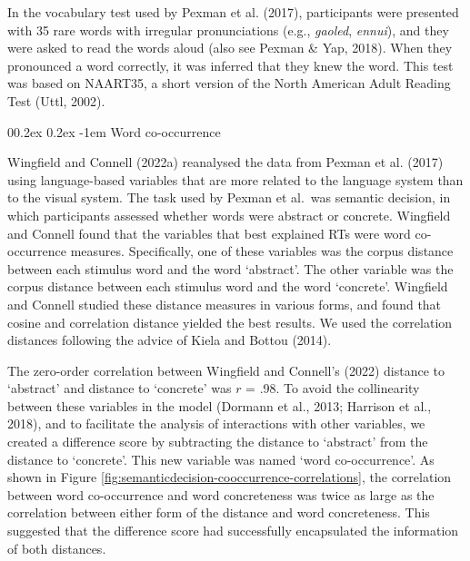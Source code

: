 \documentclass[
  12pt,
  man,floatsintext]{apa7}
\makeatletter
\let\oldparagraph\paragraph
\renewcommand{\paragraph}[1]{\oldparagraph{#1}\mbox{}}
\renewcommand{\paragraph}{\@startsection{paragraph}{4}{\parindent}%
  {0\baselineskip \@plus 0.2ex \@minus 0.2ex}%
  {-1em}%
  {\normalfont\normalsize\bfseries\itshape\typesectitle}}
\makeatother
\begin{document}
In the vocabulary test used by Pexman et al. (2017), participants were presented with 35 rare words with irregular pronunciations (e.g., \emph{gaoled}, \emph{ennui}), and they were asked to read the words aloud (also see Pexman \& Yap, 2018). When they pronounced a word correctly, it was inferred that they knew the word. This test was based on NAART35, a short version of the North American Adult Reading Test (Uttl, 2002).

\hypertarget{word-co-occurrence}{%
\paragraph{Word co-occurrence}\label{word-co-occurrence}}

Wingfield and Connell (2022a) reanalysed the data from Pexman et al. (2017) using language-based variables that are more related to the language system than to the visual system. The task used by Pexman et al.~was semantic decision, in which participants assessed whether words were abstract or concrete. Wingfield and Connell found that the variables that best explained RTs were word co-occurrence measures. Specifically, one of these variables was the corpus distance between each stimulus word and the word `abstract'. The other variable was the corpus distance between each stimulus word and the word `concrete'. Wingfield and Connell studied these distance measures in various forms, and found that cosine and correlation distance yielded the best results. We used the correlation distances following the advice of Kiela and Bottou (2014).

The zero-order correlation between Wingfield and Connell's (2022) distance to `abstract' and distance to `concrete' was \(r\) = .98. To avoid the collinearity between these variables in the model (Dormann et al., 2013; Harrison et al., 2018), and to facilitate the analysis of interactions with other variables, we created a difference score by subtracting the distance to `abstract' from the distance to `concrete'. This new variable was named `word co-occurrence'. As shown in Figure \ref{fig:semanticdecision-cooccurrence-correlations}, the correlation between word co-occurrence and word concreteness was twice as large as the correlation between either form of the distance and word concreteness. This suggested that the difference score had successfully encapsulated the information of both distances.
\end{document}
